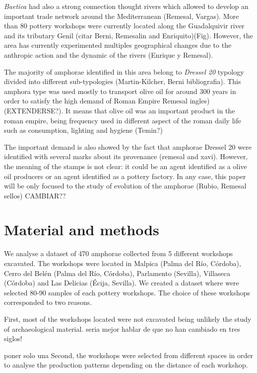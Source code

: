 \documentclass[review, twocolumn]{elsarticle}
\begin{document}
\emph{Baetica} had also a strong connection thought rivers which allowed to develop an important trade network around the Mediterranean (Remesal, Vargas). More than 80 pottery workshops were currently located along the Guadalquivir river and its tributary Genil (citar Berni, Remesalin and Enriquito)(Fig). However, the area has currently experimented multiples geographical changes due to the anthropic action and the dynamic of the rivers (Enrique y Remesal). 

The majority of amphorae identified in this area belong to \emph{Dressel 20} typology divided into different sub-typologies (Martin-Kilcher, Berni bibliografia). This amphora type was used mostly to transport olive oil for around 300 years in order to satisfy the high demand of Roman Empire Remesal ingles) (EXTENDERSE?). 
It means that olive oil was an important product in the roman empire, being frequency used in different aspect of the roman daily life such as consumption, lighting and hygiene (Temin?)

The important demand is also showed by the fact that amphorae Dressel 20 were identified with several marks about its provenance (remesal and xavi). However, the meaning of the stamps is not clear: it could be an agent identified as a olive oil producers or an agent identified as a pottery factory. In any case, this paper will be only focused to the study of evolution of the amphorae (Rubio, Remesal sellos) CAMBIAR??


\section{Material and methods}

We analyse a dataset of 470 amphorae collected from 5 different workshops excavated. 
The workshops were located in Malpica (Palma del R\'io, C\'ordoba), Cerro del Bel\'en (Palma del R\'io, C\'ordoba), Parlamento (Sevilla), Villaseca (C\'ordoba) and Las Delicias (\'Ecija, Sevilla). We created a dataset where were selected 80-90 samples of each pottery workshops. The choice of these workshops corresponded to two reasons. 


First, most of the workshops located were not excavated being unlikely the study of archaeological material. seria mejor hablar de que no han cambiado en tres siglos! 

poner solo una 
Second, the workshops were selected from different spaces in order to analyse the production patterns depending on the distance of each workshop. 
\end{document}
